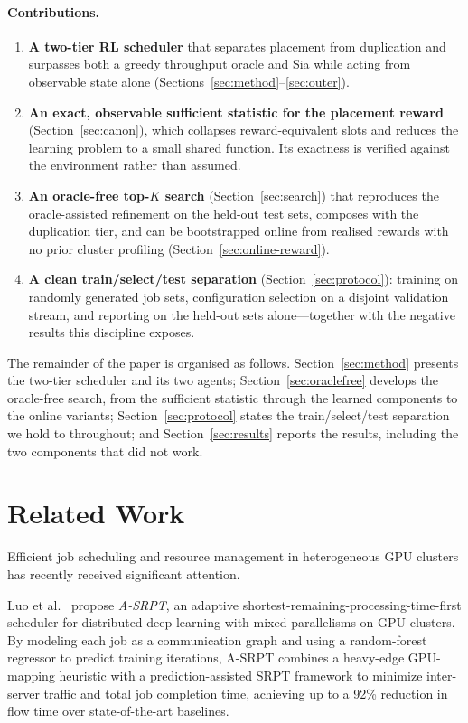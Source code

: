 \documentclass{article}
\begin{document}
\paragraph{Contributions.}
\begin{enumerate}\itemsep2pt
\item \textbf{A two-tier RL scheduler} that separates placement from
  duplication and surpasses both a greedy throughput oracle and Sia while acting
  from observable state alone (Sections~\ref{sec:method}--\ref{sec:outer}).
\item \textbf{An exact, observable sufficient statistic for the placement reward}
  (Section~\ref{sec:canon}), which collapses reward-equivalent slots and reduces
  the learning problem to a small shared function. Its exactness is verified
  against the environment rather than assumed.
\item \textbf{An oracle-free top-$K$ search} (Section~\ref{sec:search}) that
  reproduces the oracle-assisted refinement on the held-out test sets, composes
  with the duplication tier, and can be bootstrapped online from realised rewards
  with no prior cluster profiling (Section~\ref{sec:online-reward}).
\item \textbf{A clean train/select/test separation} (Section~\ref{sec:protocol}):
  training on randomly generated job sets, configuration selection on a disjoint
  validation stream, and reporting on the held-out sets alone---together with the
  negative results this discipline exposes.
\end{enumerate}

The remainder of the paper is organised as follows.
Section~\ref{sec:method} presents the two-tier scheduler and its two agents;
Section~\ref{sec:oraclefree} develops the oracle-free search, from the sufficient
statistic through the learned components to the online variants;
Section~\ref{sec:protocol} states the train/select/test separation we hold to
throughout; and Section~\ref{sec:results} reports the results, including the two
components that did not work.

\section{Related Work}
\label{sec:related}

Efficient job scheduling and resource management in heterogeneous GPU clusters
has recently received significant attention.

Luo et al.~\cite{luo2025prediction} propose \emph{A-SRPT}, an adaptive
shortest-remaining-processing-time-first scheduler for distributed deep
learning with mixed parallelisms on GPU clusters.  By modeling each job as a
communication graph and using a random-forest regressor to predict training
iterations, A-SRPT combines a heavy-edge GPU-mapping heuristic with a
prediction-assisted SRPT framework to minimize inter-server traffic and total
job completion time, achieving up to a 92\% reduction in flow time over
state-of-the-art baselines.
\end{document}
